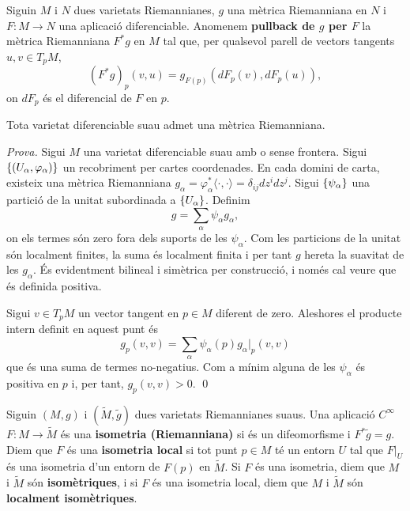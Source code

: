\begin{defi}
    Siguin $M$ i $N$ dues varietats Riemannianes, $g$ una mètrica Riemanniana en $N$ i $F:M\to N$ una aplicació diferenciable. Anomenem \textbf{pullback de $g$ per $F$} la mètrica Riemanniana $F^*g$ en $M$ tal que, per qualsevol parell de vectors tangents $u,v\in T_pM$,
    \begin{equation*}
        (F^*g)_p(v,u) = g_{F(p)}(dF_p(v),dF_p(u)),
    \end{equation*}
    on $dF_p$ és el diferencial de $F$ en $p$.
\end{defi}

\begin{prop}
    Tota varietat diferenciable suau admet una mètrica Riemanniana.
\end{prop}
{
    \color{green!50!black} \textit{Prova.}
    Sigui $M$ una varietat diferenciable suau {\color{blue}amb o sense frontera}. Sigui $\{(U_\alpha,\varphi_\alpha)\}$ un recobriment per cartes coordenades. En cada domini de carta, existeix una mètrica Riemanniana $g_\alpha = \varphi_\alpha^*\langle\cdot,\cdot\rangle = \delta_{ij}dz^idz^j$. Sigui $\{\psi_\alpha\}$ una partició de la unitat subordinada a $\{U_\alpha\}$. Definim 
    \begin{equation*}
        g = \sum_{\alpha} \psi_\alpha g_\alpha,
    \end{equation*}
    on els termes són zero fora dels suports de les $\psi_\alpha$. Com les particions de la unitat són localment finites, la suma és localment finita i per tant $g$ hereta la suavitat de les $g_\alpha$. És evidentment bilineal i simètrica per construcció, i només cal veure que és definida positiva.

    Sigui $v\in T_pM$ un vector tangent en $p\in M$ diferent de zero. Aleshores el producte intern definit en aquest punt és
    \begin{equation*}
        g_p(v,v) = \sum_\alpha \psi_\alpha(p) g_\alpha|_p(v,v)
    \end{equation*}
    que és una suma de termes no-negatius. Com a mínim alguna de les $\psi_\alpha$ és positiva en $p$ i, per tant, $g_p(v,v) > 0$.
    \qed
}

\begin{defi}
    Siguin $(M,g)$ i $(\tilde M,\tilde g)$ dues varietats Riemannianes {\color{blue} suaus}. Una aplicació {\color{blue} $C^\infty$} $F: M\to \tilde M$ és una \textbf{isometria (Riemanniana)} si és un difeomorfisme i $F^*\tilde g = g$. Diem que $F$ és una \textbf{isometria local} si tot punt $p\in M$ té un entorn $U$ tal que $F|_U$ és una isometria d'un entorn de $F(p)$ en $\tilde M$. Si $F$ és una isometria, diem que $M$ i $\tilde M$ són \textbf{isomètriques}, i si $F$ és una isometria local, diem que $M$ i $\tilde M$ són \textbf{localment isomètriques}.
\end{defi}

